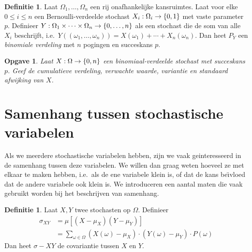 \documentclass[a4paper]{book}
\newtheorem{exercise}[theorem]{Opgave}
\theoremstyle{definition}
\newtheorem{definition}[theorem]{Definitie}
\begin{document}
\begin{definition}
    Laat $\Omega_1, \dots, \Omega_n$ een rij onafhankelijke kansruimtes.
    Laat voor elke $0 \leq i \leq n$ een Bernoulli-verdeelde stochast $X_i : \Omega_i \to \set{0,1}$ met vaste parameter $p$.
    Definieer $Y : \Omega_1 \times \cdots \times \Omega_n \to \set{0, \dots, n}$ als een stochast die de som van alle $X_i$ beschrijft,
    i.e.\ $Y((\omega_1, \dots, \omega_n)) = X(\omega_1) + \cdots + X_n(\omega_n)$.
    Dan heet $P_Y$ een \emph{binomiale verdeling} met $n$ pogingen en succeskans $p$.
\end{definition}

\begin{exercise}
    Laat $X : \Omega \to \set{0,n}$ een binomiaal-verdeelde stochast met succeskans $p$.
    Geef de cumulatieve verdeling, verwachte waarde, variantie en standaard afwijking van $X$.
\end{exercise}




\section{Samenhang tussen stochastische variabelen}
Als we meerdere stochastische variabelen hebben, zijn we vaak geinteresseerd in de samenhang tussen deze variabelen.
We willen dan graag weten hoeveel ze met elkaar te maken hebben, i.e.\ als de ene variabele klein is, of dat de kans be\"{\i}vloed dat de andere
variabele ook klein is. We introduceren een aantal maten die vaak gebruikt worden bij het beschrijven van samenhang.

\begin{definition}
    Laat $X,Y$ twee stochasten op $\Omega$.
    Definieer
    \begin{align*}
        \sigma_{XY} &= \mu[ (X - \mu_X)(Y - \mu_Y) ] \\
                    &= \sum_{\omega \in \Omega} (X(\omega) - \mu_X) \cdot (Y(\omega) - \mu_Y) \cdot P(\omega)
    \end{align*}
    Dan heet $\sigma-{XY}$ de covariantie tussen $X$ en $Y$.
\end{definition}
\end{document}
